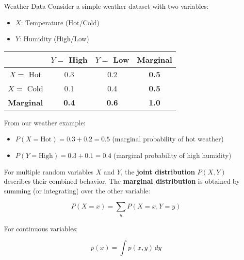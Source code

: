 \begin{examplebox}{Weather Data}
Consider a simple weather dataset with two variables:
\begin{itemize}
    \item $X$: Temperature (Hot/Cold)
    \item $Y$: Humidity (High/Low)
\end{itemize}

\begin{center}
\begin{tabular}{|c|c|c|c|}
\hline
 & $Y=$ High & $Y=$ Low & \textbf{Marginal} \\
\hline
$X=$ Hot & 0.3 & 0.2 & \textbf{0.5} \\
$X=$ Cold & 0.1 & 0.4 & \textbf{0.5} \\
\hline
\textbf{Marginal} & \textbf{0.4} & \textbf{0.6} & \textbf{1.0} \\
\hline
\end{tabular}
\end{center}

From our weather example:
\begin{itemize}
    \item $P(X=\text{Hot}) = 0.3 + 0.2 = 0.5$ (marginal probability of hot weather)
    \item $P(Y=\text{High}) = 0.3 + 0.1 = 0.4$ (marginal probability of high humidity)
\end{itemize}
\end{examplebox}


For multiple random variables $X$ and $Y$, the \textbf{joint distribution} $P(X, Y)$ describes their combined behavior. The \textbf{marginal distribution} is obtained by summing (or integrating) over the other variable:

\begin{equation}
P(X=x) = \sum_{y} P(X=x, Y=y)
\end{equation}

For continuous variables:

\begin{equation}
p(x) = \int p(x, y) \, dy
\end{equation}
